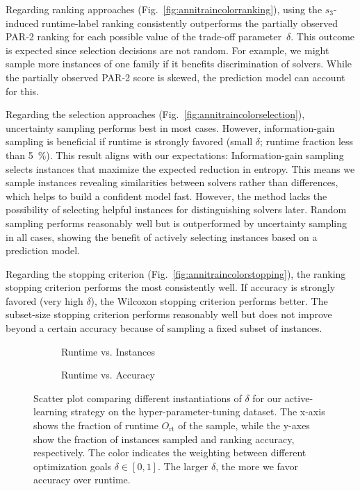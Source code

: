 \documentclass[runningheads]{llncs}
\begin{document}
Regarding ranking approaches (Fig.~\ref{fig:annitraincolorranking}), using the $s_3$-induced runtime-label ranking consistently outperforms the partially observed PAR-2 ranking for each possible value of the trade-off parameter~$\delta$.
This outcome is expected since selection decisions are not random.
For example, we might sample more instances of one family if it benefits discrimination of solvers.
While the partially observed PAR-2 score is skewed, the prediction model can account for this.

Regarding the selection approaches (Fig.~\ref{fig:annitraincolorselection}), uncertainty sampling performs best in most cases.
However, information-gain sampling is beneficial if runtime is strongly favored (small $\delta$; runtime fraction less than \SI{5}{\%}).
This result aligns with our expectations:
Information-gain sampling selects instances that maximize the expected reduction in entropy.
This means we sample instances revealing similarities between solvers rather than differences, which helps to build a confident model fast.
However, the method lacks the possibility of selecting helpful instances for distinguishing solvers later.
Random sampling performs reasonably well but is outperformed by uncertainty sampling in all cases, showing the benefit of actively selecting instances based on a prediction model.

Regarding the stopping criterion (Fig.~\ref{fig:annitraincolorstopping}), the ranking stopping criterion performs the most consistently well.
If accuracy is strongly favored (very high $\delta$), the Wilcoxon stopping criterion performs better.
The subset-size stopping criterion performs reasonably well but does not improve beyond a certain accuracy because of sampling a fixed subset of instances.

\begin{figure}[tb!]
  \centering
  \begin{subfigure}{0.4775\textwidth}
    \caption{Runtime vs. Instances}
    \label{fig:annitrainoptgoalruntime}
  \end{subfigure}
  \begin{subfigure}{0.5125\textwidth}
    \caption{Runtime vs. Accuracy}
    \label{fig:annitrainoptgoalacc}
  \end{subfigure}

  \caption{
    Scatter plot comparing different instantiations of $\delta$ for our active-learning strategy on the hyper-parameter-tuning dataset.
    The x-axis shows the fraction of runtime $O_{\operatorname{rt}}$ of the sample, while the y-axes show the fraction of instances sampled and ranking accuracy, respectively.
    The color indicates the weighting between different optimization goals $\delta \in \left[0, 1\right]$.
    The larger $\delta$, the more we favor accuracy over runtime.
  }
  \label{fig:annitrainoptgoal}
\end{figure}
\end{document}
